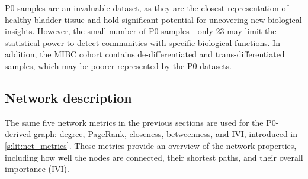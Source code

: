 P0 samples are an invaluable dataset, as they are the closest representation of healthy bladder tissue and hold significant potential for uncovering new biological insights. However, the small number of P0 samples—only 23 may limit the statistical power to detect communities with specific biological functions. In addition, the MIBC cohort contains de-differentiated and trans-differentiated samples, which may be poorer represented by the P0 datasets.



\subsection{Network description} \label{s:N_I:p0_tum_description}

The same five network metrics in the previous sections are used for the P0-derived graph: degree, PageRank, closeness, betweenness, and IVI, introduced in \cref{s:lit:net_metrics}. These metrics provide an overview of the network properties, including how well the nodes are connected, their shortest paths, and their overall importance (IVI).


